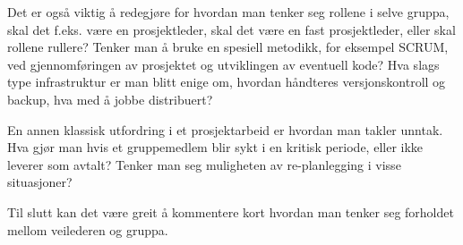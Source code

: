 \documentclass[11pt,a4paper]{report}
\begin{document}
Det er også viktig å redegjøre for hvordan man tenker seg rollene i selve gruppa, skal det f.eks. være en prosjektleder, skal det være en fast prosjektleder, eller skal rollene rullere? Tenker man å bruke en spesiell metodikk, for eksempel SCRUM, ved gjennomføringen av prosjektet og utviklingen av eventuell kode? Hva slags type infrastruktur er man blitt enige om, hvordan håndteres versjonskontroll og backup, hva med å jobbe distribuert?

En annen klassisk utfordring i et prosjektarbeid er hvordan man takler unntak. Hva gjør man hvis et gruppemedlem blir sykt i en kritisk periode, eller ikke leverer som avtalt? Tenker man seg muligheten av re-planlegging i visse situasjoner?

Til slutt kan det være greit å kommentere kort hvordan man tenker seg forholdet mellom veilederen og gruppa. 
\end{document}
